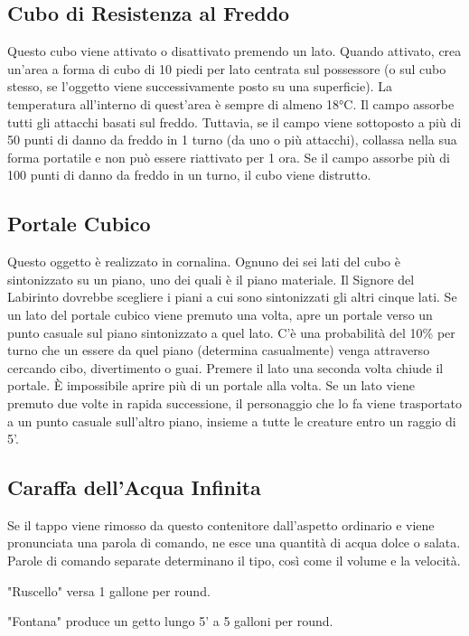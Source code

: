 \documentclass{article}
\begin{document}
\begin{multicols}{2}
\begin{table}[h]
\end{table}

\subsection{Cubo di Resistenza al Freddo}
Questo cubo viene attivato o disattivato premendo un lato. Quando attivato, crea un'area a forma di cubo di 10 piedi per lato centrata sul possessore (o sul cubo stesso, se l'oggetto viene successivamente posto su una superficie). La temperatura all'interno di quest'area è sempre di almeno 18°C. Il campo assorbe tutti gli attacchi basati sul freddo. Tuttavia, se il campo viene sottoposto a più di 50 punti di danno da freddo in 1 turno (da uno o più attacchi), collassa nella sua forma portatile e non può essere riattivato per 1 ora. Se il campo assorbe più di 100 punti di danno da freddo in un turno, il cubo viene distrutto.

\subsection{Portale Cubico}
Questo oggetto è realizzato in cornalina. Ognuno dei sei lati del cubo è sintonizzato su un piano, uno dei quali è il piano materiale. Il Signore del Labirinto dovrebbe scegliere i piani a cui sono sintonizzati gli altri cinque lati. Se un lato del portale cubico viene premuto una volta, apre un portale verso un punto casuale sul piano sintonizzato a quel lato. C'è una probabilità del 10\% per turno che un essere da quel piano (determina casualmente) venga attraverso cercando cibo, divertimento o guai. Premere il lato una seconda volta chiude il portale. È impossibile aprire più di un portale alla volta. Se un lato viene premuto due volte in rapida successione, il personaggio che lo fa viene trasportato a un punto casuale sull'altro piano, insieme a tutte le creature entro un raggio di 5'.

\subsection{Caraffa dell'Acqua Infinita}
Se il tappo viene rimosso da questo contenitore dall'aspetto ordinario e viene pronunciata una parola di comando, ne esce una quantità di acqua dolce o salata. Parole di comando separate determinano il tipo, così come il volume e la velocità.

"Ruscello" versa 1 gallone per round.

"Fontana" produce un getto lungo 5' a 5 galloni per round.


\end{multicols}
\end{document}
